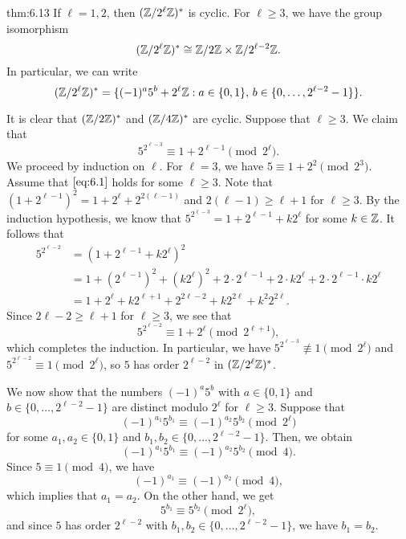 \vspace{2ex}
\begin{theo}{thm:6.13}
    If $\ell = 1, 2$, then $(\mathbb{Z}/2^\ell\mathbb{Z})^*$ is cyclic. For $\ell \geq 3$, 
    we have the group isomorphism 
    \[ (\mathbb{Z}/2^\ell\mathbb{Z})^* \cong \mathbb{Z}/2\mathbb{Z} \times \mathbb{Z}/2^{\ell-2}\mathbb{Z}. \] 
    In particular, we can write 
    \[ (\mathbb{Z}/2^\ell\mathbb{Z})^* = \{(-1)^a 5^b + 2^\ell\mathbb{Z} : a \in \{0, 1\},\, 
    b \in \{0, \dots, 2^{\ell-2}-1\}\}. \] 
\end{theo}
\begin{pf} 
    It is clear that $(\mathbb{Z}/2\mathbb{Z})^*$ and $(\mathbb{Z}/4\mathbb{Z})^*$ are cyclic. Suppose that $\ell 
    \geq 3$. We claim that 
    \begin{equation}\label{eq:6.1}
        5^{2^{\ell-3}} \equiv 1 + 2^{\ell-1} \pmod{2^\ell}. 
    \end{equation}
    We proceed by induction on $\ell$. For $\ell = 3$, we have $5 \equiv 
    1 + 2^2 \pmod{2^3}$. Assume that $\eqref{eq:6.1}$ holds for some $\ell \geq 3$. 
    Note that $(1 + 2^{\ell-1})^2 = 1 + 2^\ell + 2^{2(\ell-1)}$ and 
    $2(\ell-1) \geq \ell+1$ for $\ell \geq 3$. By the induction hypothesis, 
    we know that $5^{2^{\ell-3}} = 1 + 2^{\ell-1} + k2^\ell$ for some $k \in \mathbb{Z}$. 
    It follows that 
    \begin{align*}
        5^{2^{\ell-2}} 
        &= (1 + 2^{\ell-1} + k2^\ell)^2 \\ 
        &= 1 + (2^{\ell-1})^2 + (k2^\ell)^2 + 2 \cdot 2^{\ell-1} + 2 \cdot k2^\ell 
        + 2 \cdot 2^{\ell-1} \cdot k2^\ell \\ 
        &= 1 + 2^\ell + k2^{\ell+1} + 2^{2\ell-2} + k2^{2\ell} + k^2 2^{2\ell}. 
    \end{align*}
    Since $2\ell - 2 \geq \ell + 1$ for $\ell \geq 3$, we see that 
    \[ 5^{2^{\ell-2}} \equiv 1 + 2^\ell \pmod{2^{\ell+1}}, \] 
    which completes the induction. In particular, we have $5^{2^{\ell-3}} 
    \not\equiv 1 \pmod{2^\ell}$ and $5^{2^{\ell-2}} \equiv 1 \pmod{2^\ell}$, 
    so $5$ has order $2^{\ell-2}$ in $(\mathbb{Z}/2^\ell\mathbb{Z})^*$. 

    We now show that the numbers $(-1)^a 5^b$ with $a \in \{0, 1\}$ and 
    $b \in \{0, \dots, 2^{\ell-2} - 1\}$ are distinct modulo $2^\ell$ for 
    $\ell \geq 3$. Suppose that 
    \[ (-1)^{a_1} 5^{b_1} \equiv (-1)^{a_2} 5^{b_2} \pmod{2^\ell} \] 
    for some $a_1, a_2 \in \{0, 1\}$ and $b_1, b_2 \in \{0, \dots, 2^{\ell-2} - 1\}$. 
    Then, we obtain 
    \[ (-1)^{a_1} 5^{b_1} \equiv (-1)^{a_2} 5^{b_2} \pmod 4. \] 
    Since $5 \equiv 1 \pmod 4$, we have 
    \[ (-1)^{a_1} \equiv (-1)^{a_2} \pmod{4}, \] 
    which implies that $a_1 = a_2$. On the other hand, we get 
    \[ 5^{b_1} \equiv 5^{b_2} \pmod{2^\ell}, \] 
    and since $5$ has order $2^{\ell-2}$ with $b_1, b_2 \in \{0, \dots, 
    2^{\ell-2}-1\}$, we have $b_1 = b_2$. 
\end{pf}

